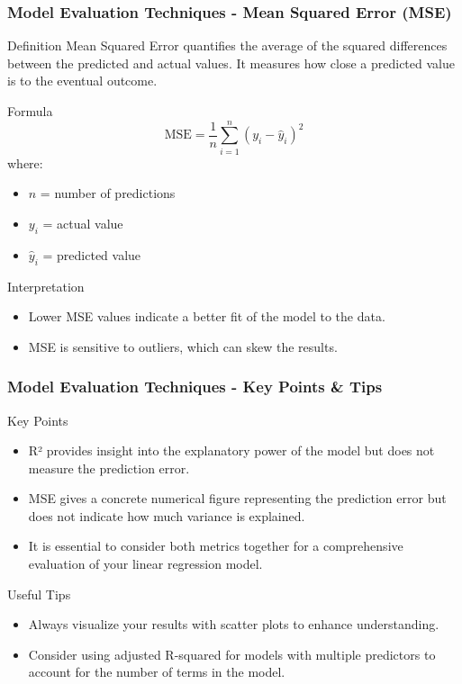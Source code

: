 \documentclass[aspectratio=169]{beamer}
\begin{document}
\begin{frame}[fragile]
    \frametitle{Model Evaluation Techniques - Mean Squared Error (MSE)}
    \begin{block}{Definition}
        Mean Squared Error quantifies the average of the squared differences between the predicted and actual values. It measures how close a predicted value is to the eventual outcome.
    \end{block}

    \begin{block}{Formula}
        \[
        \text{MSE} = \frac{1}{n} \sum_{i=1}^{n} (y_i - \hat{y}_i)^2
        \]
        where:
        \begin{itemize}
            \item \(n\) = number of predictions
            \item \(y_i\) = actual value
            \item \(\hat{y}_i\) = predicted value
        \end{itemize}
    \end{block}

    \begin{block}{Interpretation}
        \begin{itemize}
            \item Lower MSE values indicate a better fit of the model to the data.
            \item MSE is sensitive to outliers, which can skew the results.
        \end{itemize}
    \end{block}
\end{frame}

\begin{frame}[fragile]
    \frametitle{Model Evaluation Techniques - Key Points & Tips}
    \begin{block}{Key Points}
        \begin{itemize}
            \item R² provides insight into the explanatory power of the model but does not measure the prediction error.
            \item MSE gives a concrete numerical figure representing the prediction error but does not indicate how much variance is explained.
            \item It is essential to consider both metrics together for a comprehensive evaluation of your linear regression model.
        \end{itemize}
    \end{block}

    \begin{block}{Useful Tips}
        \begin{itemize}
            \item Always visualize your results with scatter plots to enhance understanding.
            \item Consider using adjusted R-squared for models with multiple predictors to account for the number of terms in the model.
        \end{itemize}
    \end{block}
\end{frame}
\end{document}
